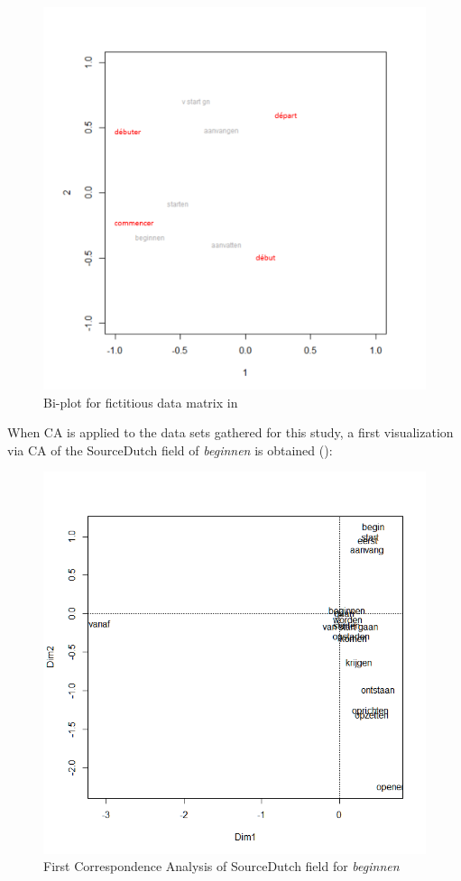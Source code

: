 \begin{figure}
\includegraphics[height=.4\textheight]{figures/Vandevoorde2-img18.png}
\caption{\label{fig:3:18}  Bi-plot for fictitious data matrix in }
\end{figure}

When CA is applied to the data sets gathered for this study, a first visualization via CA of the SourceDutch field of \textit{beginnen} is obtained ():


\begin{figure}
\includegraphics[height=.4\textheight]{figures/Vandevoorde2-img19.png}
\caption{\label{fig:3:19}  First Correspondence Analysis of SourceDutch field for \textit{beginnen}}
\end{figure}

